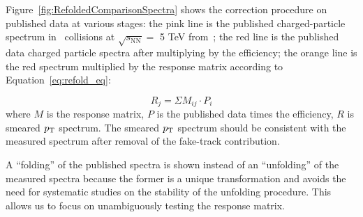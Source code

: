 Figure~\ref{fig:RefoldedComparisonSpectra} shows the correction procedure on published data at various stages: the pink line is the published charged-particle spectrum in \pPb~collisions at {$\sqrt{s_{\mathrm{NN}}}=$ 5 TeV} from~\cite{Acharya:2018qsh}; the red line is the published data charged particle spectra after multiplying by the efficiency; the orange line is the red spectrum multiplied by the response matrix according to Equation~\ref{eq:refold_eq}:

\begin{equation}\label{eq:refold_eq}
R_{j} = \Sigma M_{ij} \cdot P_{i}
\end{equation}
where $M$ is the response matrix, $P$ is the published data times the efficiency, $R$ is smeared $p_{\mathrm{T}}$ spectrum. The smeared $p_{\mathrm{T}}$ spectrum should be consistent with the measured spectrum after removal of the fake-track contribution.

A ``folding'' of the published spectra is shown instead of an ``unfolding'' of the measured spectra because the former is a unique transformation and avoids the need for systematic studies on the stability of the unfolding procedure. This allows us to focus on unambiguously testing the response matrix. 

